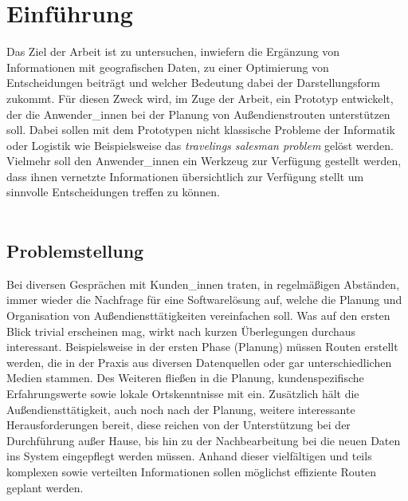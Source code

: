 \documentclass[Bachelorarbeit.tex]{subfiles}
\begin{document}
\chapter{Einführung}
\label{chap:einfuehrung}

Das Ziel der Arbeit ist zu untersuchen, 
inwiefern die Ergänzung  von Informationen mit geografischen Daten, 
zu einer Optimierung von Entscheidungen beiträgt und welcher Bedeutung dabei der Darstellungsform zukommt. 
Für diesen Zweck wird, im Zuge der Arbeit, ein Prototyp entwickelt, der die Anwender\_innen bei der Planung von Außendienstrouten unterstützen soll. 
Dabei sollen mit dem Prototypen nicht klassische Probleme der Informatik oder Logistik wie Beispielsweise das \textit{travelings salesman problem} gelöst werden. Vielmehr soll den Anwender\_innen ein Werkzeug zur Verfügung gestellt werden, dass ihnen vernetzte Informationen übersichtlich zur Verfügung stellt um sinnvolle Entscheidungen treffen zu können.\\
\\

\section{Problemstellung}
\label{chap:einfuehrung:sec:problemstellung}

Bei diversen Gesprächen mit Kunden\_innen traten, in regelmäßigen Abständen, immer wieder die Nachfrage für eine Softwarelösung auf, welche die Planung und Organisation von Außendiensttätigkeiten vereinfachen soll. 
Was auf den ersten Blick trivial erscheinen mag, wirkt nach kurzen Überlegungen durchaus interessant. 
Beispielsweise in der ersten Phase (Planung) müssen Routen erstellt werden, die in der Praxis aus diversen Datenquellen oder gar unterschiedlichen Medien stammen. 
Des Weiteren fließen in die Planung, kundenspezifische Erfahrungswerte sowie lokale Ortskenntnisse mit ein.
Zusätzlich hält die Außendiensttätigkeit, auch noch nach der Planung, weitere interessante Herausforderungen bereit, diese reichen von der Unterstützung bei der Durchführung außer Hause,  bis hin zu der Nachbearbeitung bei die neuen Daten ins System eingepflegt werden müssen.
Anhand dieser vielfältigen und teils komplexen sowie verteilten Informationen sollen möglichst effiziente Routen geplant werden. 


\begin{comment}
Als Grundlage für den Prototypen dient die Software Pery der Firma Perfany GmbH. 
Dabei handelt es sich um 
Wobei der Fokus auf dem Ticket Modul der Software ruht. Dabei ist das Anwendungskonzept des Moduls so ausgelegt das sämtliche Aufgaben, die die Firma betreffen , einzeln als Tickets erfasst werden. 
\end{comment}
\end{document}
